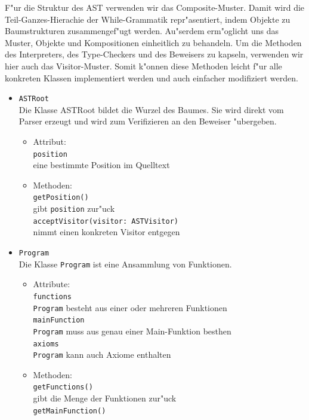\documentclass[10pt,a4paper,titlepage]{article}
\begin{document}
F"ur die Struktur des AST verwenden wir das Composite-Muster. Damit wird die Teil-Ganzes-Hierachie der While-Grammatik repr"asentiert, indem Objekte zu Baumstrukturen zusammengef"ugt werden. Au"serdem erm"oglicht uns das Muster, Objekte und Kompositionen einheitlich zu behandeln. Um die Methoden des Interpreters, des Type-Checkers und des Beweisers zu kapseln, verwenden wir hier auch das Visitor-Muster. Somit k"onnen diese Methoden leicht f"ur alle konkreten Klassen implementiert werden und auch einfacher modifiziert werden. 
\begin{itemize}
\item \texttt{ASTRoot} \\
Die Klasse ASTRoot bildet die Wurzel des Baumes. Sie wird direkt vom Parser erzeugt und wird zum Verifizieren an den Beweiser "ubergeben. 
\begin{itemize}
\item Attribut: \\
\texttt{position} \\
eine bestimmte Position im Quelltext
\item Methoden: \\
\texttt{getPosition()} \\
gibt \texttt{position} zur"uck \\
\texttt{acceptVisitor(visitor: ASTVisitor)} \\
nimmt einen konkreten Visitor entgegen
\end{itemize}
\item \texttt{Program} \\
Die Klasse \texttt{Program} ist eine Ansammlung von Funktionen. 
\begin{itemize}
\item Attribute: \\
\texttt{functions} \\
\texttt{Program} besteht aus einer oder mehreren Funktionen\\
\texttt{mainFunction} \\
\texttt{Program} muss aus genau einer Main-Funktion besthen \\
\texttt{axioms} \\
\texttt{Program} kann auch Axiome enthalten
\item Methoden: \\
\texttt{getFunctions()} \\
gibt die Menge der Funktionen zur"uck \\
\texttt{getMainFunction()} \\

\end{itemize}
\end{itemize}
\end{document}
